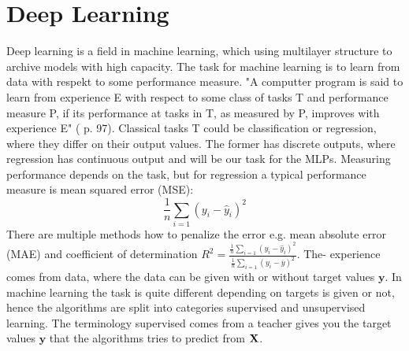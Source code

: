 
\chapter{Deep Learning} %

\label{Chapter4} %

Deep learning is a field in machine learning, which using multilayer structure to archive models with high capacity. The task for machine learning is to learn from data with respekt to some performance measure. "A computter program is said to learn from experience E with respect to some class of tasks T and performance measure P, if its performance at tasks in T, as measured by P, improves with experience E" (\parencite{Goodfellow-et-al-2016} p. 97). Classical tasks T could be classification or regression, where they differ on their output values. The former has discrete outputs, where regression has continuous output and will be our task for the MLPs. Measuring performance depends on the task, but for regression a typical performance measure is mean squared error (MSE):
$$\frac{1}{n}\sum_{i=1} (y_i-\hat{y}_i)^2$$
There are multiple methods how to penalize the error e.g. mean absolute error (MAE) and coefficient of determination $R^2=\frac{\frac{1}{n}\sum_{i=1} (y_i-\hat{y}_i)^2}{\frac{1}{n}\sum_{i=1} (y_i-\bar{y})^2}$. The- experience comes from data, where the data can be given with or without target values $\bm{y}$. In machine learning the task is quite different depending on targets is given or not, hence the algorithms are split into categories supervised and unsupervised learning. The terminology supervised comes from a teacher gives you the target values $\bm{y}$ that the algorithms tries to predict from $\mathbf{X}$.\\

